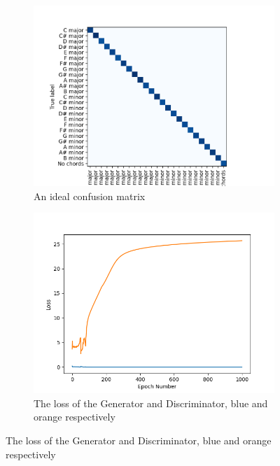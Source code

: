 \begin{figure}
    \centering
    \begin{subfigure}{0.3\columnwidth}
        \centering
        \includegraphics[width=\columnwidth]{Figures/confusion_ideal}
        \decoRule
        \caption{An ideal confusion matrix}
        \label{fig:confusion_ideal}
    \end{subfigure}
    \hfill
    \begin{subfigure}{0.3\columnwidth}
        \centering
        \includegraphics[width=\columnwidth]{Figures/ModelLoss}
        \decoRule
        \caption{The loss of the Generator and Discriminator, blue and orange respectively}
        \label{fig:ModelLoss}
    \end{subfigure}

\end{figure}
